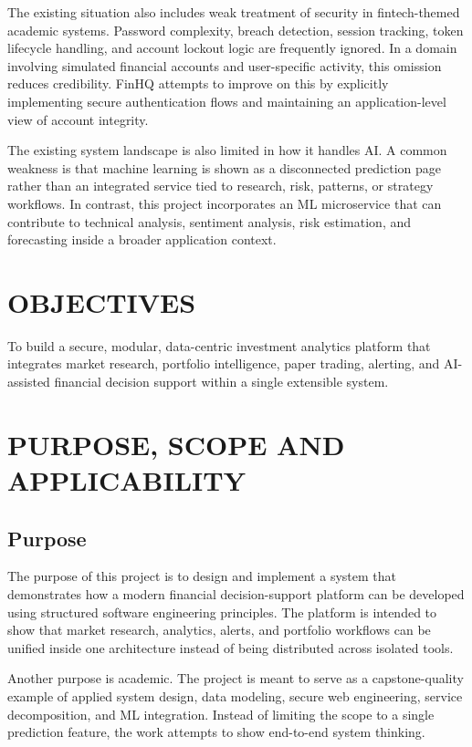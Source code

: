 \documentclass[12pt,a4paper]{report}
\newcommand{\projectshort}{FinHQ}
\begin{document}
The existing situation also includes weak treatment of security in fintech-themed academic systems. Password complexity, breach detection, session tracking, token lifecycle handling, and account lockout logic are frequently ignored. In a domain involving simulated financial accounts and user-specific activity, this omission reduces credibility. \projectshort{} attempts to improve on this by explicitly implementing secure authentication flows and maintaining an application-level view of account integrity.

The existing system landscape is also limited in how it handles AI. A common weakness is that machine learning is shown as a disconnected prediction page rather than an integrated service tied to research, risk, patterns, or strategy workflows. In contrast, this project incorporates an ML microservice that can contribute to technical analysis, sentiment analysis, risk estimation, and forecasting inside a broader application context.

\section{OBJECTIVES}
To build a secure, modular, data-centric investment analytics platform that integrates market research, portfolio intelligence, paper trading, alerting, and AI-assisted financial decision support within a single extensible system.

\section{PURPOSE, SCOPE AND APPLICABILITY}
\subsection{Purpose}
The purpose of this project is to design and implement a system that demonstrates how a modern financial decision-support platform can be developed using structured software engineering principles. The platform is intended to show that market research, analytics, alerts, and portfolio workflows can be unified inside one architecture instead of being distributed across isolated tools.

Another purpose is academic. The project is meant to serve as a capstone-quality example of applied system design, data modeling, secure web engineering, service decomposition, and ML integration. Instead of limiting the scope to a single prediction feature, the work attempts to show end-to-end system thinking.
\end{document}

